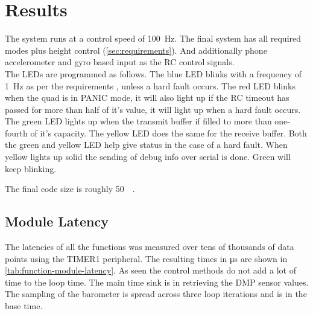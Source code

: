\documentclass[final]{article}
\begin{document}
\section{Results}




The system runs at a control speed of \SI{100}{\hertz}.
The final system has all required modes plus height control (\cref{sec:requirements}).
And additionally phone accelerometer and gyro based input as the RC control signals.\\
The LEDs are programmed as follows.
The blue LED blinks with a frequency of \SI{1}{\hertz} as per the requirements , unless a hard fault occurs.
The red LED blinks when the quad is in PANIC mode, it will also light up if the RC timeout has passed for more than half of it's value, it will light up when a hard fault occurs.
The green LED lights up when the transmit buffer if filled to more than one-fourth of it's capacity.
The yellow LED does the same for the receive buffer.
Both the green and yellow LED help give status in the case of a hard fault.
When yellow lights up solid the sending of debug info over serial is done.
Green will keep blinking.

The final code size is roughly \SI{50}{\kilo\byte}.



\subsection{Module Latency}
\label{ssec:module-latency}
The latencies of all the functions was measured over tens of thousands of data points using the TIMER1 peripheral.
The resulting times in \si{\micro\second} are shown in \cref{tab:function-module-latency}.
As seen the control methods do not add a lot of time to the loop time.
The main time sink is in retrieving the DMP sensor values.
The sampling of the barometer is spread across three loop iterations and is in the base time.
\end{document}
